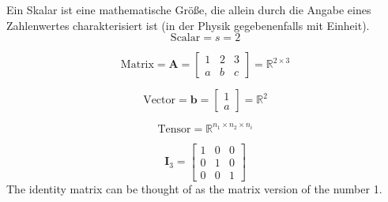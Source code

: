 \documentclass[../Main.tex]{subfiles}
\begin{document}
\begin{multicols}{2}
    Ein Skalar ist eine mathematische Größe,
    die allein durch die Angabe eines Zahlenwertes
    charakterisiert ist (in der Physik gegebenenfalls mit Einheit).
    \begin{equation}
        \text{Scalar} = s = 2
    \end{equation}

    \begin{equation}
        \text{Matrix} = \textbf{A} =
        \begin{bmatrix}
            1 & 2 & 3\\
            a & b & c
        \end{bmatrix} = \mathbb{R}^{2 \times 3}
    \end{equation}

    \begin{equation}
        \text{Vector} = \textbf{b} =
        \begin{bmatrix}
            1 \\
            a
        \end{bmatrix} = \mathbb{R}^2
    \end{equation}

    \begin{equation}
        \text{Tensor} = \mathbb{R}^{n_1 \times n_2 \times n_i}
    \end{equation}

    \begin{equation}
        \boldsymbol{I}_3 =
        \begin{bmatrix}
            1 & 0 & 0 \\
            0 & 1 & 0 \\
            0 & 0 & 1
        \end{bmatrix}
    \end{equation}
    The identity matrix can be thought of 
    as the matrix version of the number 1.
\end{multicols}

\end{document}
